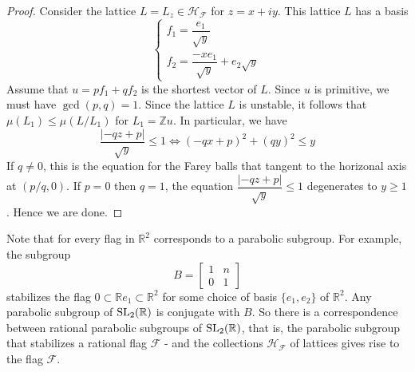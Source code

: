 \begin{proof}
  Consider the lattice $L=L_z \in \mathcal{H}_\mathcal{F}$ for $z = x+iy$. This lattice $L$ has a basis
  \[\begin{cases}
      f_1 = \dfrac{e_1}{\sqrt{y}} \\
      f_2 = \dfrac{-xe_1}{\sqrt{y}}+e_2\sqrt{y}
    \end{cases}\]
  Assume that $u=pf_1+qf_2$ is the shortest vector of $L$. Since $u$ is primitive, we must have $\gcd(p,q)=1$. Since the lattice
  $L$ is unstable, it follows that $\mu(L_1) \le \mu(L/L_1)$ for $L_1 = \mathbb{Z}u$. In particular, we have
  \[\dfrac{|-qz+p|}{\sqrt{y}} \le 1 \Leftrightarrow (-qx+p)^2 +(qy)^2 \le y \]
  If $q \ne 0$, this is the equation for the Farey balls that tangent to the horizonal axis at $(p/q,0)$. If $p=0$ then $q=1$, the equation
  $\dfrac{|-qz+p|}{\sqrt{y}} \le 1$ degenerates to $y \ge 1$. Hence we are done.
\end{proof}
\begin{remark}
  Note that for every flag in $\mathbb{R}^2$ corresponds to a parabolic subgroup. For example, the subgroup
  \[B = \begin{bmatrix}
      1 & n \\
      0 & 1
    \end{bmatrix}\]
  stabilizes the flag $0 \subset \mathbb{R}e_1 \subset \mathbb{R}^2$ for some choice of basis $\{e_1,e_2\}$ of $\mathbb{R}^2$. Any parabolic subgroup of $\operatorname{SL_2(\mathbb{R})}$ is conjugate with $B$. So there is a correspondence between
  rational parabolic subgroups of $\operatorname{SL_2(\mathbb{R})}$, that is, the parabolic subgroup that stabilizes a rational flag $\mathcal{F}$ - and the collections $\mathcal{H}_\mathcal{F}$ of lattices
  gives rise to the flag $\mathcal{F}$.
\end{remark}
